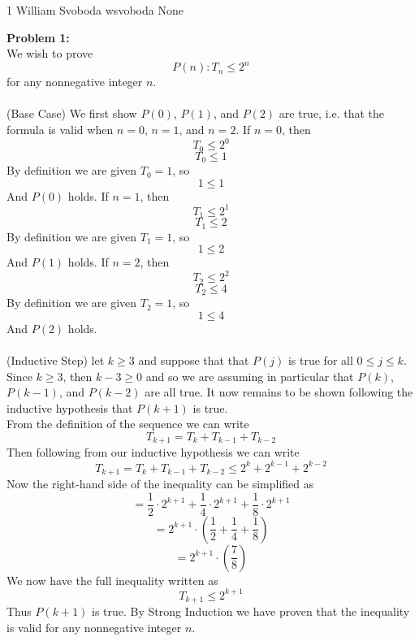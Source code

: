 \documentclass[12pt,letterpaper]{cos340hw}
\begin{document}
           {1}            %
           {William Svoboda}  %
           {wsvoboda}   %
           {None} 




\noindent\textbf{Problem 1:}\\
We wish to prove
$$P(n): T_n\le2^n$$
for any nonnegative integer $n$.\\\\
(Base Case) We first show $P(0)$, $P(1)$, and $P(2)$ are true, i.e. that the formula is valid when
$n=0$, $n=1$, and $n=2$. If $n=0$, then
$$T_0\le2^0$$
$$T_0\le1$$
By definition we are given $T_0=1$, so
$$1\le1$$
And $P(0)$ holds. If $n=1$, then
$$T_1\le2^1$$
$$T_1\le2$$
By definition we are given $T_1=1$, so
$$1\le2$$
And $P(1)$ holds. If $n=2$, then
$$T_2\le2^2$$
$$T_2\le4$$
By definition we are given $T_2=1$, so
$$1\le4$$
And $P(2)$ holds.\\\\
(Inductive Step) let $k\ge3$ and suppose that that $P(j)$ is true for all $0\le j\le k$. Since $k\ge3$, then 
$k-3\ge0$ and so we are assuming in particular that $P(k)$, $P(k-1)$, and $P(k-2)$ are all true. It 
now remains to be shown following the inductive hypothesis that $P(k+1)$ is true. \\
From the definition of the sequence we can write
$$T_{k+1}=T_k+T_{k-1}+T_{k-2}$$
Then following from our inductive hypothesis we can write
$$T_{k+1}=T_k+T_{k-1}+T_{k-2}\le2^k+2^{k-1}+2^{k-2}$$
Now the right-hand side of the inequality can be simplified as
$$=\frac{1}{2}\cdot2^{k+1}+\frac{1}{4}\cdot2^{k+1}+\frac{1}{8}\cdot2^{k+1}$$
$$=2^{k+1}\cdot(\frac{1}{2}+\frac{1}{4}+\frac{1}{8})$$
$$=2^{k+1}\cdot(\frac{7}{8})$$
We now have the full inequality written as
$$T_{k+1}\le2^{k+1}$$
Thus $P(k+1)$ is true. By Strong Induction we have proven that the inequality is valid for any 
nonnegative integer $n$.

\end{document}
